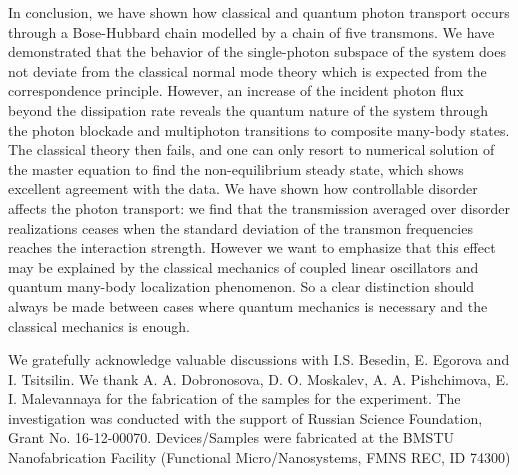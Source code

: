 \documentclass[%
 aps, pra,
 amsmath,amssymb,
 reprint,%
superscriptaddress
]{revtex4-2}
\begin{document}
In conclusion, we have shown how classical and quantum photon transport occurs through a Bose-Hubbard chain modelled by a chain of five transmons. We have demonstrated that the behavior of the single-photon subspace of the system does not deviate from the classical normal mode theory which is expected from the correspondence principle. However, an increase of the incident photon flux beyond the dissipation rate reveals the quantum nature of the system through the photon blockade and multiphoton transitions to composite many-body states. The classical theory then fails, and one can only resort to numerical solution of the master equation to find the non-equilibrium steady state, which shows excellent agreement with the data. We have shown how controllable disorder affects the photon transport: we find that the transmission averaged over disorder realizations ceases when the standard deviation of the transmon frequencies reaches the interaction strength. However we want to emphasize that this effect may be explained by the classical mechanics of coupled linear oscillators and quantum many-body localization phenomenon. So a clear distinction should always be made between cases where quantum mechanics is necessary and the classical mechanics is enough.

We gratefully acknowledge valuable discussions with I.S. Besedin, E. Egorova and I. Tsitsilin. We thank  A. A. Dobronosova, D. O. Moskalev, A. A. Pishchimova, E. I. Malevannaya for the fabrication of the samples for the experiment. The investigation was conducted with the support of Russian Science Foundation, Grant No. 16-12-00070. Devices/Samples were fabricated at the BMSTU Nanofabrication Facility (Functional Micro/Nanosystems, FMNS REC, ID 74300)


\end{document}
